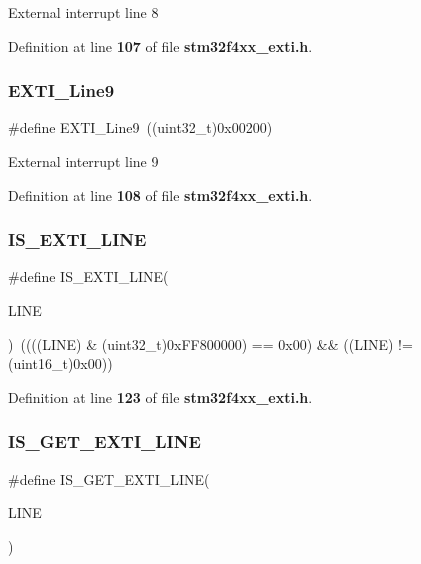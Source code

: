 External interrupt line 8 

Definition at line \textbf{ 107} of file \textbf{ stm32f4xx\+\_\+exti.\+h}.

\mbox{\label{group__EXTI__Lines_ga340ca6bb77b7a2d7747c78e7d3370360}} 
\subsubsection{E\+X\+T\+I\+\_\+\+Line9}
{\footnotesize\ttfamily \#define E\+X\+T\+I\+\_\+\+Line9~((uint32\+\_\+t)0x00200)}

External interrupt line 9 

Definition at line \textbf{ 108} of file \textbf{ stm32f4xx\+\_\+exti.\+h}.

\mbox{\label{group__EXTI__Lines_gaade8b8717a1d78f83d3cf180e2817557}} 
\subsubsection{I\+S\+\_\+\+E\+X\+T\+I\+\_\+\+L\+I\+NE}
{\footnotesize\ttfamily \#define I\+S\+\_\+\+E\+X\+T\+I\+\_\+\+L\+I\+NE(\begin{DoxyParamCaption}\item[{}]{L\+I\+NE }\end{DoxyParamCaption})~((((L\+I\+NE) \& (uint32\+\_\+t)0x\+F\+F800000) == 0x00) \&\& ((\+L\+I\+N\+E) != (uint16\+\_\+t)0x00))}



Definition at line \textbf{ 123} of file \textbf{ stm32f4xx\+\_\+exti.\+h}.

\mbox{\label{group__EXTI__Lines_ga77c85c7b8426c6cfe91b4f5a2c58ecda}} 
\subsubsection{I\+S\+\_\+\+G\+E\+T\+\_\+\+E\+X\+T\+I\+\_\+\+L\+I\+NE}
{\footnotesize\ttfamily \#define I\+S\+\_\+\+G\+E\+T\+\_\+\+E\+X\+T\+I\+\_\+\+L\+I\+NE(\begin{DoxyParamCaption}\item[{}]{L\+I\+NE }\end{DoxyParamCaption})}

